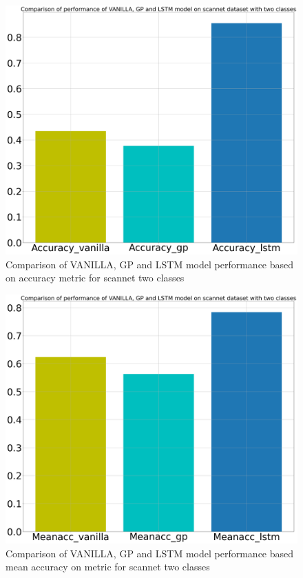	\begin{figure}
		\centering
		\includegraphics[width=12cm]{images/two_classes_acc.png}
		\caption{Comparison of VANILLA, GP and LSTM model performance based on accuracy metric for scannet two classes}
		\label{fig:unet_model_metric_comparison}
	\end{figure}

	\begin{figure}
		\centering
		\includegraphics[width=12cm]{images/two_classes_meanacc.png}
		\caption{Comparison of VANILLA, GP and LSTM model performance based mean accuracy on metric for scannet two classes}
		\label{fig:unet_model_metric_comparison}
	\end{figure}

